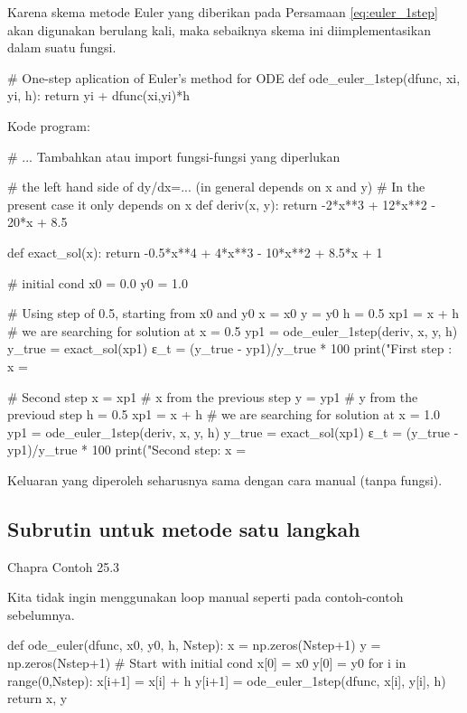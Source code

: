 Karena skema metode Euler yang diberikan pada Persamaan \eqref{eq:euler_1step}
akan digunakan berulang kali, maka sebaiknya skema ini diimplementasikan dalam
suatu fungsi.
\begin{pythoncode}
# One-step aplication of Euler's method for ODE
def ode_euler_1step(dfunc, xi, yi, h):
    return yi + dfunc(xi,yi)*h
\end{pythoncode}

Kode program:
\begin{pythoncode}
# ... Tambahkan atau import fungsi-fungsi yang diperlukan

# the left hand side of dy/dx=... (in general depends on x and y)
# In the present case it only depends on x
def deriv(x, y):
    return -2*x**3 + 12*x**2 - 20*x + 8.5

def exact_sol(x):
    return -0.5*x**4 + 4*x**3 - 10*x**2 + 8.5*x + 1

# initial cond
x0 = 0.0
y0 = 1.0

# Using step of 0.5, starting from x0 and y0
x = x0
y = y0
h = 0.5
xp1 = x + h # we are searching for solution at x = 0.5
yp1 = ode_euler_1step(deriv, x, y, h)
y_true = exact_sol(xp1)
ε_t = (y_true - yp1)/y_true * 100
print("First step : x = %

# Second step
x = xp1 # x from the previous step
y = yp1 # y from the previoud step
h = 0.5
xp1 = x + h # we are searching for solution at x = 1.0
yp1 = ode_euler_1step(deriv, x, y, h)
y_true = exact_sol(xp1)
ε_t = (y_true - yp1)/y_true * 100
print("Second step: x = %
\end{pythoncode}
Keluaran yang diperoleh seharusnya sama dengan cara manual (tanpa fungsi).








\subsection*{Subrutin untuk metode satu langkah}
Chapra Contoh 25.3

Kita tidak ingin menggunakan loop manual seperti pada contoh-contoh sebelumnya.

\begin{pythoncode}
def ode_euler(dfunc, x0, y0, h, Nstep):
    x = np.zeros(Nstep+1)
    y = np.zeros(Nstep+1)
    # Start with initial cond
    x[0] = x0
    y[0] = y0
    for i in range(0,Nstep):
        x[i+1] = x[i] + h
        y[i+1] = ode_euler_1step(dfunc, x[i], y[i], h)
    return x, y
\end{pythoncode}

